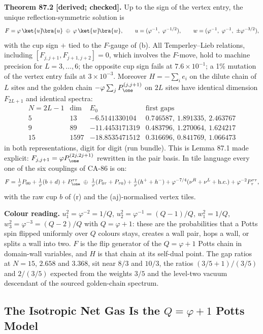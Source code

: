 \textbf{Theorem 87.2 [derived; checked].}  Up to the sign of the vertex
entry, the unique reflection-symmetric solution is
\[
  F=\varphi\,\ket{u}\!\bra{u}\;\oplus\;\varphi\,\ket{w}\!\bra{w},\qquad
  u=(\varphi^{-1},\ \varphi^{-1/2}),\qquad
  w=(\varphi^{-1},\ \varphi^{-1},\ \pm\varphi^{-3/2}),
\]
with the cup sign \(+\) tied to the \(F\)-gauge of (b).  All Temperley--Lieb
relations, including \([F_{j,j+1},F_{j+1,j+2}]=0\), which involves the
\(F\)-move, hold to machine precision for \(L=3,\dots,6\); the opposite cup
sign fails at \(7.6\times10^{-1}\); a 1\% mutation of the vertex entry fails
at \(3\times10^{-3}\).  Moreover \(H=-\sum_ie_i\) on the dilute chain of
\(L\) sites and the golden chain \(-\varphi\sum_jP_{\one}^{(j,j+1)}\) on
\(2L\) sites have identical dimension \(F_{2L+1}\) and identical spectra:
\[
\begin{array}{c|c|c|c}
N=2L-1 & \dim & E_0 & \text{first gaps}\\\hline
5 & 13 & -6.5141330104 & 0.746587,\ 1.891335,\ 2.463767\\
9 & 89 & -11.4453171319 & 0.483796,\ 1.270064,\ 1.624217\\
15 & 1597 & -18.8535471512 & 0.316696,\ 0.841769,\ 1.066473
\end{array}
\]
in both representations, digit for digit (run bundle).  This is Lemma 87.1
made explicit: \(F_{j,j+1}=\varphi P_{\one}^{(2j,2j+1)}\) rewritten in the
pair basis.  In tile language every one of the six couplings of CA-86 is on:
\[
  F=\tfrac1\varphi P_{00}+\tfrac1\varphi(b+d)+P_{\one}^{\tau\tau}
  \;\oplus\;\tfrac1\varphi(P_{0\tau}+P_{\tau0})+\tfrac1\varphi(h^++h^-)
  +\varphi^{-7/4}(\nu^R+\nu^L+\mathrm{h.c.})+\varphi^{-2}P_{\tau}^{\tau\tau},
\]
with the raw cup \(b\) of (r) and the (aj)-normalised vertex tiles.

\textbf{Colour reading.}  \(u_1^2=\varphi^{-2}=1/Q\), \(u_2^2=\varphi^{-1}=(Q-1)/Q\),
\(w_1^2=1/Q\), \(w_3^2=\varphi^{-3}=(Q-2)/Q\) with \(Q=\varphi+1\): these are
the probabilities that a Potts spin flipped uniformly over \(Q\) colours
stays, creates a wall pair, hops a wall, or splits a wall into two.  \(F\) is
the flip generator of the \(Q=\varphi+1\) Potts chain in domain-wall
variables, and \(H\) is that chain at its self-dual point.  The gap ratios at
\(N=15\), \(2.658\) and \(3.368\), sit near \(8/3\) and \(10/3\), the ratios
\((3/5+1)/(3/5)\) and \(2/(3/5)\) expected from the weights \(3/5\) and the
level-two vacuum descendant of the sourced golden-chain spectrum.

\subsection{The Isotropic Net Gas Is the \(Q=\varphi+1\) Potts Model}

